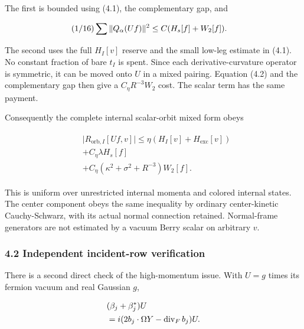 The first is bounded using (4.1), the complementary gap, and

\begin{gather*}
\begin{aligned}
& (1/16)\sum  \Vert Q_{\alpha}(Uf)\Vert ^{2} \le  C(H_{s}[f]+W_{2}[f]).
\end{aligned}\notag
\end{gather*}

The second uses the full \(H_{I}[v]\) reserve and the small low-leg
estimate in (4.1). No constant fraction of bare \(t_{I}\) is spent.
Since each derivative-curvature operator is symmetric, it can be moved
onto \(U\) in a mixed pairing. Equation (4.2) and the complementary gap
then give a \(C_{\eta} R^{-3}W_{2}\) cost. The scalar term has the same
payment.

Consequently the complete internal scalar-orbit mixed form obeys

\begin{gather*}
\begin{aligned}
& \vert R_{\mathrm{orb},I}[Uf,v]\vert  \le  \eta (H_{I}[v]+H_{\mathrm{exc}}[v]) \\
& +C_{\eta} \lambda  H_{s}[f] \\
& +C_{\eta}(\kappa ^{2}+\sigma ^{2}+R^{-3})W_{2}[f].
\end{aligned}\tag{4.4}
\end{gather*}

This is uniform over unrestricted internal momenta and colored internal
states. The center component obeys the same inequality by ordinary
center-kinetic Cauchy-Schwarz, with its actual normal connection
retained. Normal-frame generators are not estimated by a vacuum Berry
scalar on arbitrary \(v\).

\subsubsection{4.2 Independent incident-row
verification}\label{i-independent-incident-row-verification}

There is a second direct check of the high-momentum issue. With \(U=g\)
times its fermion vacuum and real Gaussian \(g\),

\begin{gather*}
\begin{aligned}
& (\beta _{j}+\beta _{j}^{*})U \\
& =i(2 b_{j} \cdot  \Omega  Y-\operatorname{div} _{F} b_{j})U.
\end{aligned}\notag
\end{gather*}

